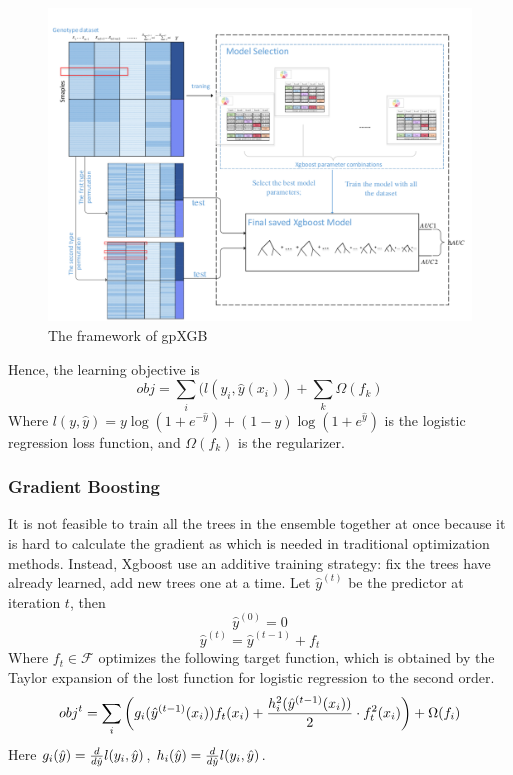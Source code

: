 \documentclass[11pt]{article}
\theoremstyle{plain}
\theoremstyle{definition}
\theoremstyle{remark}
\begin{document}
\begin{figure}[H]
    \begin{center}
       \includegraphics[scale=0.4]{framework_of_gpXGB}
    \end{center}
\caption{\label{fig1} The framework of gpXGB}
\end{figure}

Hence, the learning objective is
\begin{equation}
obj=\sum_i(l(y_i,\hat{y}(x_i))+\sum_k\Omega(f_k)
\end{equation}
Where $l(y,\hat{y})=y\log(1+e^{-\hat{y}})+(1-y)\log(1+e^{\hat{y}})$ is the logistic regression loss function, and $\Omega(f_k)$ is the regularizer.

\subsubsection{Gradient Boosting}
It is not feasible to train all the trees in the ensemble together at once because it is hard to calculate the gradient as which is needed in traditional optimization methods. Instead, Xgboost use an additive training strategy: fix the trees have already learned, add new trees one at a time. Let $\hat{y}^{(t)}$ be the
predictor at iteration $t$, then
\begin{equation}
\hat{y}^{(0)}=0
\end{equation}
\begin{equation}
\hat{y}^{(t)}=\hat{y}^{(t-1)}+f_t
\end{equation}
Where $f_t\in\mathcal{F}$ optimizes the following target function, which is obtained by the Taylor expansion of the lost function for logistic regression to the second order.
\begin{equation}
obj^t=\sum_i\left(g_i(\hat{y}^{(t-1)}(x_i))f_t(x_i)+{h_i^2(\hat{y}^{(t-1)}(x_i))\over 2}\cdot f_t^2(x_i)\right)+\Omega(f_i)
\end{equation}
Here $g_i(\hat{y})={d\over d\hat{y}}l(y_i,\hat{y})$, $h_i(\hat{y})={d\over d\hat{y}}l(y_i,\hat{y})$.
\end{document}
